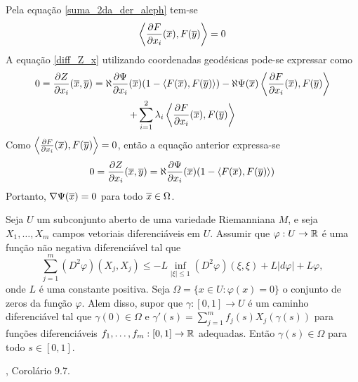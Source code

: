 \begin{demonstracao}
\begin{equation*}
	\end{equation*}	
	Pela equação \eqref{suma_2da_der_aleph} tem-se
	\begin{equation*}
		\left\langle \frac{\partial F}{\partial x_i}(\overline{x}), F(\overline{y}) \right\rangle = 0
	\end{equation*}	
	A equação \eqref{diff_Z_x} utilizando coordenadas geodésicas pode-se expressar como
	\begin{multline*}
		0 = \frac{\partial Z}{\partial x_i}(\overline{x},\overline{y}) = \aleph \frac{\partial \Psi}{\partial x_i}(\overline{x})(1 - \langle F(\overline{x}),F(\overline{y}) \rangle)  - \aleph \Psi(\overline{x}) \left\langle \frac{\partial F}{\partial x_i}(\overline{x}), F(\overline{y}) \right\rangle\\
		+ \sum_{i=1}^2 \lambda_i \left\langle \frac{\partial F}{\partial x_i}(\overline{x}),F(\overline{y}) \right\rangle
	\end{multline*}	
	Como $\left\langle \frac{\partial F}{\partial x_i}(\overline{x}),F(\overline{y}) \right\rangle = 0$, então a equação anterior expressa-se
	\begin{equation*}
		0 = \frac{\partial Z}{\partial x_i}(\overline{x},\overline{y}) = \aleph \frac{\partial \Psi}{\partial x_i}(\overline{x})(1 - \langle F(\overline{x}),F(\overline{y}) \rangle)
	\end{equation*}	
	Portanto, $\nabla \Psi(\overline{x}) = 0$ para todo $\overline{x} \in \Omega$.
\end{demonstracao}

\begin{lema}\label{bony}
	Seja $U$ um subconjunto aberto de uma variedade Riemanniana $M$, e seja $X_1, \ldots, X_m$ campos vetoriais diferenciáveis em $U$. Assumir que $\varphi: U \rightarrow \mathbb{R}$ é uma função não negativa diferenciável tal que
	\begin{equation*}
		\sum_{j=1}^{m} (D^2 \varphi)(X_j,X_j) \leq -L \inf_{|\xi| \leq 1} (D^2 \varphi)(\xi,\xi) + L |d \varphi| + L \varphi,
	\end{equation*}
	onde $L$ é uma constante positiva. Seja $\Omega = \{ x \in U: \varphi(x) = 0 \}$ o conjunto de zeros da função $\varphi$. Alem disso, supor que $\gamma: [0,1] \rightarrow U$ é um caminho diferenciável tal que $\gamma(0) \in \Omega$ e $\gamma'(s) = \sum_{j=1}^{m} f_j(s) X_j(\gamma(s))$ para funções diferenciáveis $f_1, \ldots, f_m: [0,1] \rightarrow \mathbb{R}$ adequadas. Então $\gamma(s) \in \Omega$ para todo $s \in [0,1]$.
\end{lema}

\begin{demonstracao}
	\cite{Brendle2010}, Corolário 9.7.
\end{demonstracao}

